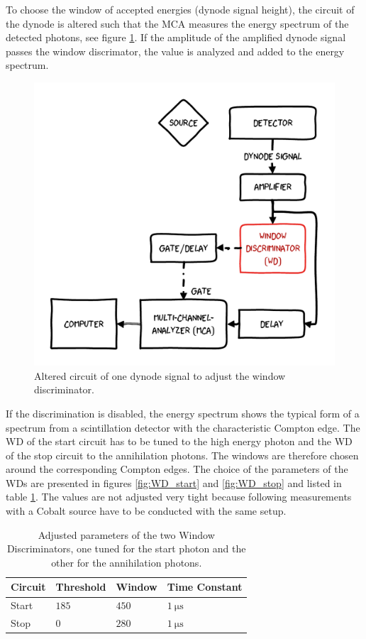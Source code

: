 \documentclass[
	paper=A4,
	parskip=full,
	chapterprefix=true,
	11pt,
	headings=normal,
	bibliography=totoc,
	listof=totoc,
	titlepage=on,
]{scrreprt}
\begin{document}
To choose the window of accepted energies (dynode signal height), the circuit of the dynode is altered such that the MCA measures the energy spectrum of the detected photons, see figure \ref{fig:WD_circuit}. If the amplitude of the amplified dynode signal passes the window discrimator, the value is analyzed and added to the energy spectrum. 
 
\begin{figure}
 	\centering
 	\includegraphics{aufbau_wd}
 	\caption{Altered circuit of one dynode signal to adjust the window discriminator.}
	\label{fig:WD_circuit}
\end{figure}
 
If the discrimination is disabled, the energy spectrum shows the typical form of a spectrum from a scintillation detector with the characteristic Compton edge. The WD of the start circuit has to be tuned to the high energy photon and the WD of the stop circuit to the annihilation photons. The windows are therefore chosen around the corresponding Compton edges. The choice of the parameters of the WDs are presented in figures \ref{fig:WD_start} and \ref{fig:WD_stop} and listed in table \ref{tbl:WD_values}. The values are not adjusted very tight because following measurements with a Cobalt source have to be conducted with the same setup.

\begin{table}[htbp]
	\centering
	\begin{tabular}{ 
			l
			l
			l
			l
		}
		\toprule
		{Circuit} & {Threshold} & {Window} & {Time Constant} \\ 
		\midrule
		Start & $185$ & $450$ & $\SI{1}{\micro\second}$ \\
		Stop & $0$ & $280$ & $\SI{1}{\micro\second}$ \\
		\bottomrule
	\end{tabular}
	\caption{Adjusted parameters of the two Window Discriminators, one tuned for the start photon and the other for the annihilation photons.}
	\label{tbl:WD_values}
\end{table}
\end{document}
